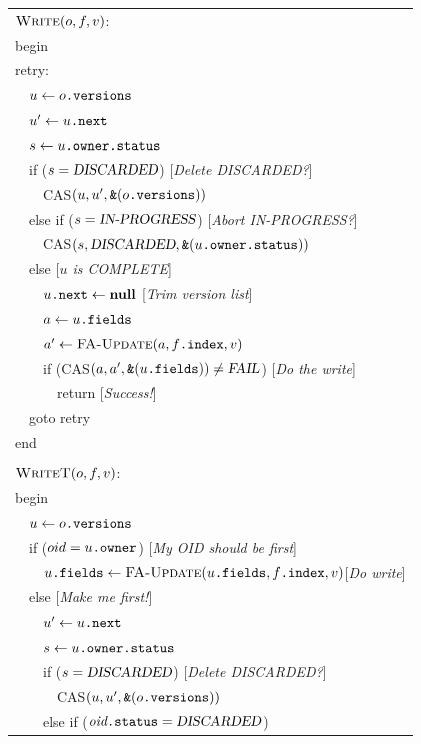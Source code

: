 \begin{figure}[p]
\sis%
\renewcommand{\>}{~~}%
\newcommand{\com}[1]{\hfill [{\sl #1}]}%
\begin{tabular}{l}%
$\text{\sc Write}(o, f, v)$:\\
begin\\
retry:\\
\>$u  \gets o\text{\tt .versions}$\\
\>$u' \gets u\text{\tt .next}$\\
\>$s  \gets u\text{\tt .owner}\text{\tt .status}$\\
\>if ($s=\text{\sl DISCARDED}$) \com{Delete DISCARDED?}\\
\>\>CAS$(u, u', \text{\tt \&}(o\text{\tt .versions}))$\\
\>else if ($s=\text{\sl IN-PROGRESS}$) \com{Abort IN-PROGRESS?}\\
\>\>CAS$(s, \text{\sl DISCARDED}, \text{\tt \&}(u\text{\tt .owner}\text{\tt .status}))$\\
\>else \com{$u$ is COMPLETE}\\
\>\>$u\text{\tt .next} \gets \text{\bf null}$ \com{Trim version list}\\
\>\>$a \gets u\text{\tt .fields}$\\
\>\>$a' \gets \text{\sc FA-Update}(a, f\text{\tt .index}, v)$\\
\>\>if (CAS$(a, a', \text{\tt \&}(u\text{\tt .fields})) \neq \text{\sl FAIL}$)
\com{Do the write}\\
\>\>\>return \com{Success!}\\
\>goto retry\\
end\\
\\
$\text{\sc WriteT}(o, f, v)$:\\
begin\\
\>$u  \gets o\text{\tt .versions}$\\
\>if ($oid = u\text{\tt .owner}$) \com{My OID should be first}\\
\>\>$u\text{\tt .fields} \gets \text{\sc FA-Update}(u\text{\tt .fields}, f\text{\tt .index}, v)$\com{Do write}\\
\>else \com{Make me first!}\\
\>\>$u' \gets u\text{\tt .next}$\\
\>\>$s  \gets u\text{\tt .owner}\text{\tt .status}$\\
\>\>if ($s=\text{\sl DISCARDED}$) \com{Delete DISCARDED?}\\
\>\>\>CAS$(u, u', \text{\tt \&}(o\text{\tt .versions}))$\\
\>\>else if ($\text{\it oid}\text{\tt .status}=\text{\sl DISCARDED}$)

\end{tabular}
\end{figure}

